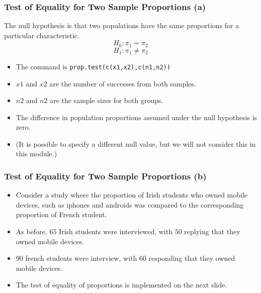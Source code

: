 \documentclass[a4]{beamer}
\begin{document}
\begin{frame}[fragile]
\frametitle{Test of Equality for Two Sample Proportions (a)}
The null hypothesis is that two populations have the same proportions for a particular characteristic.
\[H_0 : \pi_1 = \pi_2 \]
\[H_1 : \pi_1 \neq \pi_2 \]
\begin{itemize}
\item The command is \texttt{prop.test(c(x1,x2),c(n1,n2))}
\item $x1$ and $x2$ are the number of successes from both samples.
\item $n2$ and $n2$ are the sample sizes for both groups.
\item The difference in population proportions assumed under the null hypothesis is zero.
\item (It is possible to specify a different null value, but we will not consider this in this module.)
\end{itemize}
\end{frame}

\begin{frame}
\frametitle{Test of Equality for Two Sample Proportions (b)}
\begin{itemize}
\item Consider a study where the proportion of Irish students who owned mobile devices, such as iphones and androids was compared to the corresponding proportion of French student.
\item As before, $65$ Irish students were interviewed, with $50$ replying that they owned mobile devices.
\item $90$ french students were interview, with 60 responding that they owned mobile devices.
\item The test of equality of proportions is implemented on the next slide.
\end{itemize}
\end{frame}

\end{document}
